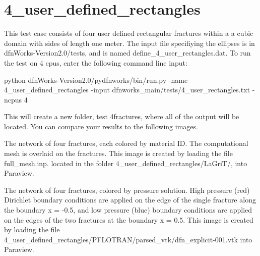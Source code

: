 \documentclass[letterpaper,10pt,english]{sphinxmanual}
\begin{document}
\section{4\_user\_defined\_rectangles}
\label{examples:user-defined-rectangles}
This test case consists of four user defined rectangular fractures within a a cubic domain with sides of length one meter. The input file specifiying the ellipses is in dfnWorks-Version2.0/tests, and is named define\_4\_user\_rectangles.dat. To run the test on 4 cpus, enter the following command line input:

python dfnWorks-Version2.0/pydfnworks/bin/run.py -name 4\_user\_defined\_rectangles -input dfnworks\_main/tests/4\_user\_rectangles.txt -ncpus 4

This will create a new folder, test 4fractures, where all of the output will be located. You can compare your results to the following images.

The network of four fractures, each colored by material ID. The computational mesh is overlaid on the fractures. This image is created by loading the file full\_mesh.inp. located in the folder 4\_user\_defined\_rectangles/LaGriT/, into Paraview.

{\hfill{}\hfill}

The network of four fractures,  colored by pressure solution.
High pressure (red) Dirichlet boundary conditions are applied on the edge of the single fracture along the boundary x = -0.5, and low pressure (blue) boundary conditions are applied on the edges of the two fractures at the boundary x = 0.5.
This image is created by loading the file 4\_user\_defined\_rectangles/PFLOTRAN/parsed\_vtk/dfn\_explicit-001.vtk into Paraview.

{\hfill{}\hfill}
\end{document}
